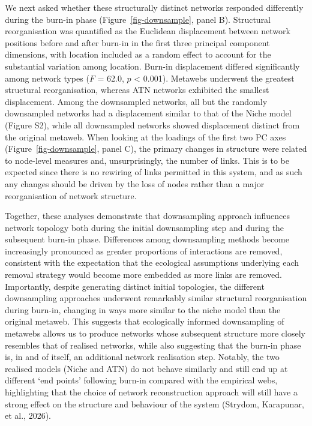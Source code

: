 \documentclass[
]{article}
\begin{document}
We next asked whether these structurally distinct networks responded
differently during the burn-in phase (Figure~\ref{fig-downsample}, panel
B). Structural reorganisation was quantified as the Euclidean
displacement between network positions before and after burn-in in the
first three principal component dimensions, with location included as a
random effect to account for the substantial variation among location.
Burn-in displacement differed significantly among network types (\(F\) =
62.0, \(p\) \textless{} 0.001). Metawebs underwent the greatest
structural reorganisation, whereas ATN networks exhibited the smallest
displacement. Among the downsampled networks, all but the randomly
downsampled networks had a displacement similar to that of the Niche
model (Figure S2), while all downsampled networks showed displacement
distinct from the original metaweb. When looking at the loadings of the
first two PC axes (Figure~\ref{fig-downsample}, panel C), the primary
changes in structure were related to node-level measures and,
unsurprisingly, the number of links. This is to be expected since there
is no rewiring of links permitted in this system, and as such any
changes should be driven by the loss of nodes rather than a major
reorganisation of network structure.

Together, these analyses demonstrate that downsampling approach
influences network topology both during the initial downsampling step
and during the subsequent burn-in phase. Differences among downsampling
methods become increasingly pronounced as greater proportions of
interactions are removed, consistent with the expectation that the
ecological assumptions underlying each removal strategy would become
more embedded as more links are removed. Importantly, despite generating
distinct initial topologies, the different downsampling approaches
underwent remarkably similar structural reorganisation during burn-in,
changing in ways more similar to the niche model than the original
metaweb. This suggests that ecologically informed downsampling of
metawebs allows us to produce networks whose subsequent structure more
closely resembles that of realised networks, while also suggesting that
the burn-in phase is, in and of itself, an additional network
realisation step. Notably, the two realised models (Niche and ATN) do
not behave similarly and still end up at different `end points'
following burn-in compared with the empirical webs, highlighting that
the choice of network reconstruction approach will still have a strong
effect on the structure and behaviour of the system (Strydom, Karapunar,
et al., 2026).
\end{document}
